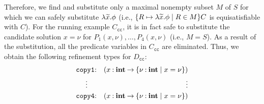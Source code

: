 Therefore, we find and substitute only a maximal nonempty subset \(M\) 
of \(S\) for which we can safely substitute \(\lambda\widetilde{x}.\phi\) (i.e., 
\(\{{R \mapsto \lambda\widetilde{x}.\phi \mid R \in M}\}C\) is equisatisfiable 
with \(C\)).
%
%
For the running example \(C_{\texttt{cc}}\), it is in fact safe to 
substitute the candidate solution \(x=\nu\) for 
\(P_1(x,\nu),\dots,P_4(x,\nu)\) (i.e., \(M=S\)).  As a result of the 
substitution, all the predicate variables in \(C_{\texttt{cc}}\) are 
eliminated.  Thus, we obtain the following refinement types for 
\(D_{\texttt{cc}}\):
\begin{eqnarray*}
\texttt{copy1}&\mathbin{:}&(x\mathbin{:}{\mathbf{int}}\mathbin{\rightarrow}{\{{\nu\mathbin{:}\mathbf{int} \mid x=\nu}\}}) \\
\vdots\quad &&\qquad\qquad \vdots \\
\texttt{copy4}&\mathbin{:}&(x\mathbin{:}{\mathbf{int}}\mathbin{\rightarrow}{\{{\nu\mathbin{:}\mathbf{int} \mid x=\nu}\}})
\end{eqnarray*}



%
